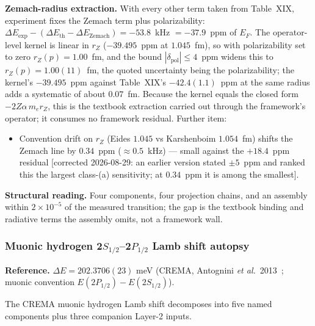 \documentclass[11pt]{article}
\begin{document}
\textbf{Zemach-radius extraction.}  With every other term taken from
Table~XIX, experiment fixes the Zemach term plus polarizability:
$\Delta E_\text{exp} - (\Delta E_\text{th} - \Delta E_\text{Zemach}) =
-53.8$~kHz $= -37.9$~ppm of $E_F$.  The operator-level kernel is linear
in $r_Z$ ($-39.495$~ppm at $1.045$~fm), so with polarizability set to
zero $r_Z(p) = 1.00$~fm, and the bound $|\delta_\text{pol}| \le 4$~ppm
widens this to $r_Z(p) = 1.00(11)$~fm, the quoted uncertainty being the
polarizability; the kernel's $-39.495$~ppm against Table~XIX's
$-42.4(1.1)$~ppm at the same radius adds a systematic of about
$0.07$~fm.  Because the kernel equals the closed
form $-2Z\alpha\,m_e r_Z$, this is the textbook extraction carried out
through the framework's operator; it consumes no framework residual.
Further item:
\begin{itemize}\setlength\itemsep{0pt}
\item Convention drift on $r_Z$ (Eides $1.045$ vs Karshenboim
$1.054$~fm) shifts the Zemach line by $0.34$~ppm ($\approx 0.5$~kHz)
--- small against the $+18.4$~ppm residual [corrected 2026-08-29: an
earlier version stated $\pm 5$~ppm and ranked this the largest
class-(a) sensitivity; at $0.34$~ppm it is among the smallest].
\end{itemize}

\textbf{Structural reading.}  Four components, four projection
chains, and an assembly within $2 \times 10^{-5}$ of the measured
transition; the gap is the textbook binding and radiative terms the
assembly omits, not a framework wall.

\subsubsection{Muonic hydrogen 2$S_{1/2}$--2$P_{1/2}$ Lamb shift autopsy}
\label{sec:autopsy_muh_lamb}

\textbf{Reference.} $\Delta E = 202.3706(23)$ meV (CREMA, Antognini
\emph{et al.}\ 2013~\cite{antognini2013}; muonic convention
$E(2P_{1/2}) - E(2S_{1/2})$).

The CREMA muonic hydrogen Lamb shift decomposes into five
named components plus three companion Layer-2 inputs.
\end{document}
